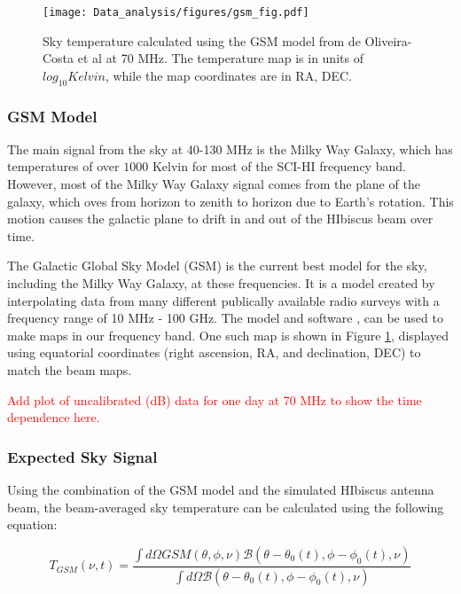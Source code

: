 \begin{figure}[htb]
\begin{center}
\texttt{[image: Data\_analysis/figures/gsm\_fig.pdf]}
\caption{Sky temperature calculated using the GSM model from de Oliveira-Costa et al \cite{GSM_model} at 70 MHz. The temperature map is in units of $log_{10} Kelvin$, while the map coordinates are in RA, DEC. }
\label{Fig:GSM_model}
\end{center}
\end{figure}

\subsubsection{GSM Model}

The main signal from the sky at 40-130 MHz is the Milky Way Galaxy, which has temperatures of over $1000$ Kelvin for most of the SCI-HI frequency band. However, most of the Milky Way Galaxy signal comes from the plane of the galaxy, which oves from horizon to zenith to horizon due to Earth's rotation. This motion causes the galactic plane to drift in and out of the HIbiscus beam over time. 


The Galactic Global Sky Model (GSM) is the current best model for the sky, including the Milky Way Galaxy, at these frequencies. It is a model created by interpolating data from many different publically available radio surveys with a frequency range of 10 MHz - 100 GHz. The model and software \cite{GSM_model}, can be used to make maps in our frequency band. One such map is shown in Figure \ref{Fig:GSM_model}, displayed using equatorial coordinates (right ascension, RA, and declination, DEC) to match the beam maps. 

\textcolor{red}{Add plot of uncalibrated (dB) data for one day at 70 MHz to show the time dependence here.}

\subsubsection{Expected Sky Signal}

Using the combination of the GSM model and the simulated HIbiscus antenna beam, the beam-averaged sky temperature can be calculated using the following equation: 

\begin{equation}
T_{GSM} (\nu,t) = \frac{ \int d \Omega GSM (\theta, \phi, \nu) \mathcal{B} (\theta - \theta_0(t), \phi - \phi_0(t),\nu)}{\int d\Omega \mathcal{B} (\theta -\theta_0(t), \phi - \phi_0(t), \nu)}
\end{equation}

